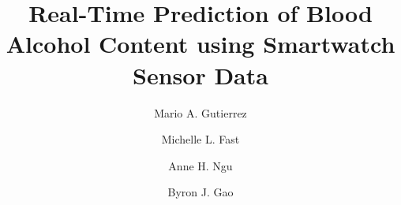 \documentclass{sty/llncs}
\begin{document}
\title{Real-Time Prediction of Blood Alcohol Content using Smartwatch Sensor Data}

\author{Mario A. Gutierrez \and Michelle L. Fast \and Anne H. Ngu \and  Byron J. Gao}

\maketitle












\end{document}
